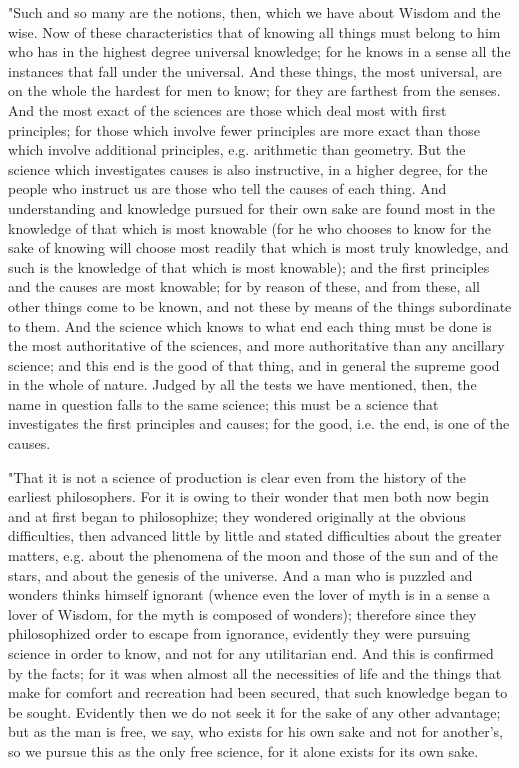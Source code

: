 "Such and so many are the notions, then, which we have about Wisdom
and the wise. Now of these characteristics that of knowing all things
must belong to him who has in the highest degree universal knowledge;
for he knows in a sense all the instances that fall under the universal.
And these things, the most universal, are on the whole the hardest
for men to know; for they are farthest from the senses. And the most
exact of the sciences are those which deal most with first principles;
for those which involve fewer principles are more exact than those
which involve additional principles, e.g. arithmetic than geometry.
But the science which investigates causes is also instructive, in
a higher degree, for the people who instruct us are those who tell
the causes of each thing. And understanding and knowledge pursued
for their own sake are found most in the knowledge of that which is
most knowable (for he who chooses to know for the sake of knowing
will choose most readily that which is most truly knowledge, and such
is the knowledge of that which is most knowable); and the first principles
and the causes are most knowable; for by reason of these, and from
these, all other things come to be known, and not these by means of
the things subordinate to them. And the science which knows to what
end each thing must be done is the most authoritative of the sciences,
and more authoritative than any ancillary science; and this end is
the good of that thing, and in general the supreme good in the whole
of nature. Judged by all the tests we have mentioned, then, the name
in question falls to the same science; this must be a science that
investigates the first principles and causes; for the good, i.e. the
end, is one of the causes. 

"That it is not a science of production is clear even from the history
of the earliest philosophers. For it is owing to their wonder that
men both now begin and at first began to philosophize; they wondered
originally at the obvious difficulties, then advanced little by little
and stated difficulties about the greater matters, e.g. about the
phenomena of the moon and those of the sun and of the stars, and about
the genesis of the universe. And a man who is puzzled and wonders
thinks himself ignorant (whence even the lover of myth is in a sense
a lover of Wisdom, for the myth is composed of wonders); therefore
since they philosophized order to escape from ignorance, evidently
they were pursuing science in order to know, and not for any utilitarian
end. And this is confirmed by the facts; for it was when almost all
the necessities of life and the things that make for comfort and recreation
had been secured, that such knowledge began to be sought. Evidently
then we do not seek it for the sake of any other advantage; but as
the man is free, we say, who exists for his own sake and not for another's,
so we pursue this as the only free science, for it alone exists for
its own sake. 

